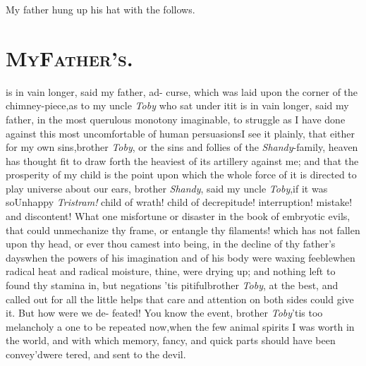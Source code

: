 \documentclass[twoside]{article}
\begin{document}
My father hung up his hat with the\break
{}
follows.

\section{\textsc{My\enspace Father's\enspace{}}.}

 is in vain longer, said my father, ad-\break
{}\break
curse, which was laid upon the corner of
the chimney-piece,\tsk as to my uncle \textit{Toby}
who sat under it\tsk it is in vain longer,
said my father, in the most querulous monotony imaginable,
to struggle as I have done against this most uncomfortable
of human persuasions\tsk I see it plainly, that either for
my own sins,\break brother \textit{Toby}, or the sins and follies
of the \textit{Shandy}-family, heaven has thought fit to
draw forth the heaviest of its artillery against me; and
that the prosperity of my child is the point upon which the
whole force of it is directed to play\tsh\break
{} universe about our ears,
brother \textit{Shandy}, said my uncle \textit{Toby},\tsk if
it was so\tsk Unhappy \textit{Tristram!} child of wrath!
child of decrepitude!  interruption! mistake! and
discontent! What one misfortune or disaster in the book of
embryotic evils, that could unmechanize thy frame, or
entangle thy filaments!  which has not fallen upon thy head,
or ever thou camest
into being, in the decline of thy father’s days\tsk when the
powers of his imagination and of his body were waxing
feeble\tsk when radical heat and radical moisture, 
 thine, were drying up;
and nothing left to found thy stamina in, but
negations\tsk\break\enlargethispage\baselineskip
\tsk ’tis pitiful\tsk brother \textit{Toby}, at the best,\break
and called out for all the little helps\break 
that care and attention on both sides\break 
could give it. But how were we de-\break
feated! You know the event, brother\break
\textit{Toby}\tsk ’tis too melancholy a one to be\break
repeated now,\tsk when the few animal\break
spirits I was worth in the world, and\break
with which memory, fancy, and quick\break
parts should have been convey’d\tsk were\break
{}
tered, and sent to the devil.\tsk{}
\end{document}
